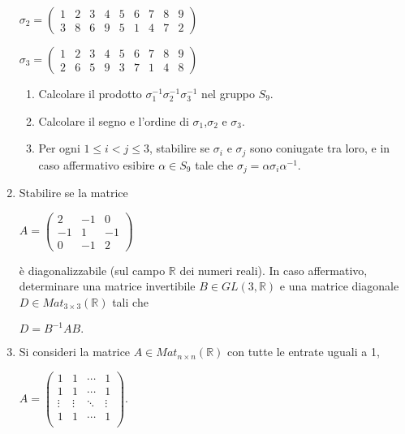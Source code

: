\documentclass[fleqn]{article}
\begin{document}
\begin{enumerate}
\begin{center}
      $ \sigma_{2} = \begin{pmatrix}
         1 & 2 & 3 & 4 & 5 & 6 & 7 & 8 & 9 \\
         3 & 8 & 6 & 9 & 5 & 1 & 4 & 7 & 2
      \end{pmatrix} $

      $ \sigma_{3} = \begin{pmatrix}
         1 & 2 & 3 & 4 & 5 & 6 & 7 & 8 & 9 \\
         2 & 6 & 5 & 9 & 3 & 7 & 1 & 4 & 8
      \end{pmatrix} $
   \end{center}

   \begin{enumerate}
      \item Calcolare il prodotto $\sigma_{1}^{-1} \sigma_{2}^{-1} \sigma_{3}^{-1}$ nel gruppo $S_9$.
      \item Calcolare il segno e l'ordine di $\sigma_{1}$,$\sigma_{2}$ e $\sigma_{3}$.
      \item Per ogni $1 \leq i < j \leq 3$, stabilire se $\sigma_{i}$ e $\sigma_{j}$ sono coniugate tra loro, e in caso affermativo esibire $\alpha \in S_9$ tale che $\sigma_{j}= \alpha \sigma_{i} \alpha^{-1}$.
   \end{enumerate}

   \item Stabilire se la matrice 
   \begin{center}
    $
    A = \begin{pmatrix}
       2 & -1 & 0 \\
       -1 & 1 & -1 \\
       0 & -1 & 2
    \end{pmatrix}
    $
    \end{center}
   è diagonalizzabile (sul campo $\mathbb{R}$ dei numeri reali). In caso affermativo, determinare una matrice invertibile
   $B \in GL(3,\mathbb{R})$ e una matrice diagonale $D \in Mat_{3 \times 3}(\mathbb{R})$ tali che  
   \begin{center}
      $D= B^{-1}AB.$
   \end{center}
   
   \item Si consideri la matrice $A \in Mat_{n \times n}(\mathbb{R})$ con tutte le entrate uguali a 1,
   \begin{center}
   $
   A = \begin{pmatrix}
      1 & 1 & \cdots & 1 \\
      1 & 1 & \cdots & 1 \\
      \vdots & \vdots & \ddots & \vdots \\
      1 & 1 & \cdots & 1 \\
      \end{pmatrix}.
   $
   \end{center}


\end{enumerate}
\end{document}
